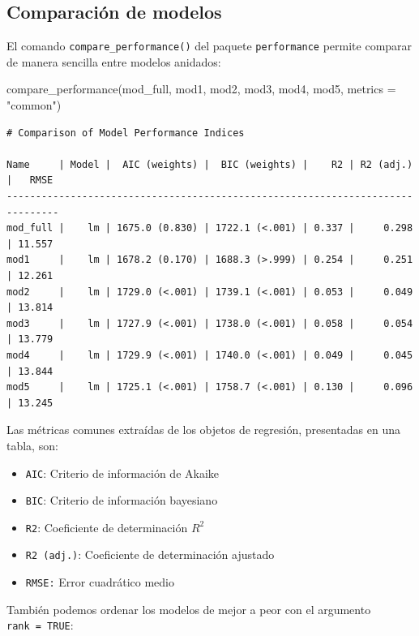 \documentclass[
  spanish,
  a4paper,
]{scrbook}
\newenvironment{Shaded}{\begin{snugshade}}{\end{snugshade}}
\newcommand{\AttributeTok}[1]{\textcolor[rgb]{0.40,0.45,0.13}{#1}}
\newcommand{\FunctionTok}[1]{\textcolor[rgb]{0.28,0.35,0.67}{#1}}
\newcommand{\NormalTok}[1]{\textcolor[rgb]{0.00,0.23,0.31}{#1}}
\newcommand{\StringTok}[1]{\textcolor[rgb]{0.13,0.47,0.30}{#1}}
\begin{document}
\subsection{Comparación de modelos}\label{comparaciuxf3n-de-modelos}

El comando \texttt{compare\_performance()} del paquete
\texttt{performance} permite comparar de manera sencilla entre modelos
anidados:

\begin{Shaded}
\begin{Highlighting}[]
\FunctionTok{compare\_performance}\NormalTok{(mod\_full, mod1, mod2, mod3, mod4, mod5, }\AttributeTok{metrics =} \StringTok{"common"}\NormalTok{)}
\end{Highlighting}
\end{Shaded}

\begin{verbatim}
# Comparison of Model Performance Indices

Name     | Model |  AIC (weights) |  BIC (weights) |    R2 | R2 (adj.) |   RMSE
-------------------------------------------------------------------------------
mod_full |    lm | 1675.0 (0.830) | 1722.1 (<.001) | 0.337 |     0.298 | 11.557
mod1     |    lm | 1678.2 (0.170) | 1688.3 (>.999) | 0.254 |     0.251 | 12.261
mod2     |    lm | 1729.0 (<.001) | 1739.1 (<.001) | 0.053 |     0.049 | 13.814
mod3     |    lm | 1727.9 (<.001) | 1738.0 (<.001) | 0.058 |     0.054 | 13.779
mod4     |    lm | 1729.9 (<.001) | 1740.0 (<.001) | 0.049 |     0.045 | 13.844
mod5     |    lm | 1725.1 (<.001) | 1758.7 (<.001) | 0.130 |     0.096 | 13.245
\end{verbatim}

Las métricas comunes extraídas de los objetos de regresión, presentadas
en una tabla, son:

\begin{itemize}
\item
  \texttt{AIC}: Criterio de información de Akaike
\item
  \texttt{BIC}: Criterio de información bayesiano
\item
  \texttt{R2}: Coeficiente de determinación \(R^2\)
\item
  \texttt{R2\ (adj.)}: Coeficiente de determinación ajustado
\item
  \texttt{RMSE:} Error cuadrático medio
\end{itemize}

También podemos ordenar los modelos de mejor a peor con el argumento
\texttt{rank\ =\ TRUE}:
\end{document}
